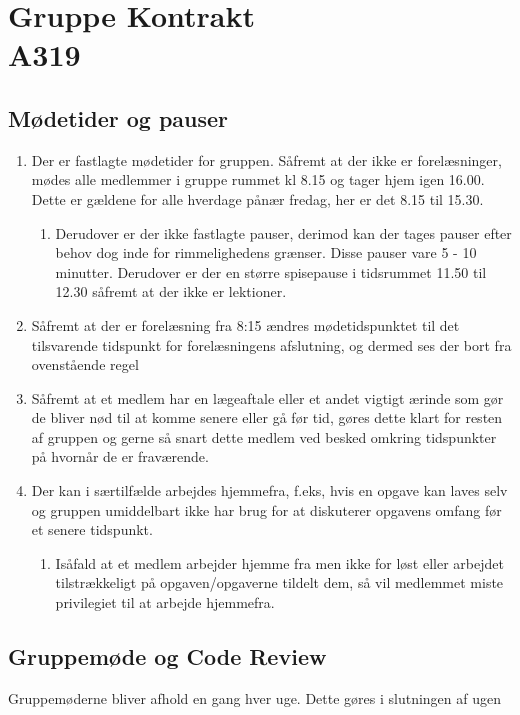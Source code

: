\chapter{Gruppe Kontrakt\\A319}
\section{Mødetider og pauser}
\begin{enumerate}
\item Der er fastlagte mødetider for gruppen. Såfremt at der ikke er forelæsninger, mødes alle medlemmer i gruppe rummet kl 8.15 og tager hjem igen 16.00. Dette er gældene for alle hverdage pånær fredag, her er det 8.15 til 15.30.
\begin{enumerate}
\item Derudover er der ikke fastlagte pauser, derimod kan der tages pauser efter behov dog inde for rimmelighedens grænser. Disse pauser vare 5 - 10 minutter. Derudover er der en større spisepause i tidsrummet 11.50 til 12.30 såfremt at der ikke er lektioner.
\end{enumerate}
\item Såfremt at der er forelæsning fra 8:15 ændres mødetidspunktet til det tilsvarende tidspunkt for forelæsningens afslutning, og dermed ses der bort fra ovenstående regel
\item Såfremt at et medlem har en lægeaftale eller et andet vigtigt ærinde som gør de bliver nød til at komme senere eller gå før tid, gøres dette klart for resten af gruppen og gerne så snart dette medlem ved besked omkring tidspunkter på hvornår de er fraværende.
\item Der kan i særtilfælde arbejdes hjemmefra, f.eks, hvis en opgave kan laves selv og gruppen umiddelbart ikke har brug for at diskuterer opgavens omfang før et senere tidspunkt.
\begin{enumerate}
\item Isåfald at et medlem arbejder hjemme fra men ikke for løst eller arbejdet tilstrækkeligt på opgaven/opgaverne tildelt dem, så vil medlemmet miste privilegiet til at arbejde hjemmefra.
\end{enumerate}
\end{enumerate}

\section{Gruppemøde og Code Review}
Gruppemøderne bliver afhold en gang hver uge. Dette gøres i slutningen af ugen

